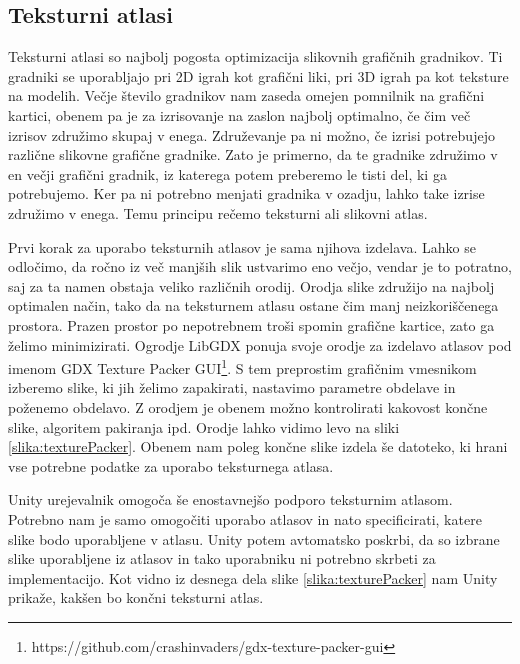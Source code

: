 \documentclass[12pt,a4paper,twoside]{book}
\begin{document}
\subsection{Teksturni atlasi}
Teksturni atlasi so najbolj pogosta optimizacija slikovnih grafičnih gradnikov. Ti gradniki se uporabljajo pri 2D igrah kot grafični liki, pri 3D igrah pa kot teksture na modelih. Večje število gradnikov nam zaseda omejen pomnilnik na grafični kartici, obenem pa je za izrisovanje na zaslon najbolj optimalno, če čim več izrisov združimo skupaj v enega. Združevanje pa ni možno, če izrisi potrebujejo različne slikovne grafične gradnike. Zato je primerno, da te gradnike združimo v en večji grafični gradnik, iz katerega potem preberemo le tisti del, ki ga potrebujemo. Ker pa ni potrebno menjati gradnika v ozadju, lahko take izrise združimo v enega. Temu principu rečemo teksturni ali slikovni atlas.

Prvi korak za uporabo teksturnih atlasov je sama njihova izdelava. Lahko se odločimo, da ročno iz več manjših slik ustvarimo eno večjo, vendar je to potratno, saj za ta namen obstaja veliko različnih orodij. Orodja slike združijo na najbolj optimalen način, tako da na teksturnem atlasu ostane čim manj neizkoriščenega prostora. Prazen prostor po nepotrebnem troši spomin grafične kartice, zato ga želimo minimizirati. Ogrodje LibGDX ponuja svoje orodje za izdelavo atlasov pod imenom GDX Texture Packer GUI\footnote{https://github.com/crashinvaders/gdx-texture-packer-gui}. S tem preprostim grafičnim vmesnikom izberemo slike, ki jih želimo zapakirati, nastavimo parametre obdelave in poženemo obdelavo. Z orodjem je obenem možno kontrolirati kakovost končne slike, algoritem pakiranja ipd. Orodje lahko vidimo levo na sliki \ref{slika:texturePacker}. Obenem nam poleg končne slike izdela še datoteko, ki hrani vse potrebne podatke za uporabo teksturnega atlasa.

Unity urejevalnik omogoča še enostavnejšo podporo teksturnim atlasom. Potrebno nam je samo omogočiti uporabo atlasov in nato specificirati, katere slike bodo uporabljene v atlasu. Unity potem avtomatsko poskrbi, da so izbrane slike uporabljene iz atlasov in tako uporabniku ni potrebno skrbeti za implementacijo. Kot vidno iz desnega dela slike \ref{slika:texturePacker} nam Unity prikaže, kakšen bo končni teksturni atlas.
\end{document}
